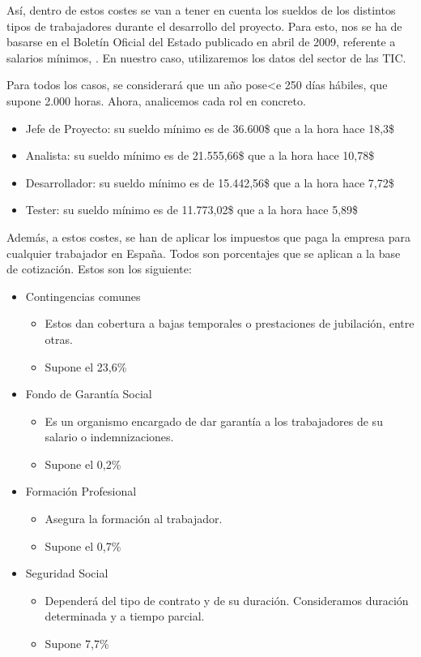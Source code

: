 Así, dentro de estos costes se van a tener en cuenta los sueldos de los distintos tipos de trabajadores durante el desarrollo del proyecto. Para esto, nos se ha de basarse en el Boletín Oficial del Estado publicado en abril de 2009, referente a salarios mínimos, \cite{boe_salarios}. En nuestro caso, utilizaremos los datos del sector de las TIC.

Para todos los casos, se considerará que un año pose<e 250 días hábiles, que supone 2.000 horas. Ahora, analicemos cada rol en concreto.

\begin{itemize}
    \item Jefe de Proyecto: su sueldo mínimo es de 36.600\$ que a la hora hace 18,3\$
    \item Analista: su sueldo mínimo es de 21.555,66\$ que a la hora hace 10,78\$
    \item Desarrollador: su sueldo mínimo es de 15.442,56\$ que a la hora hace 7,72\$
    \item Tester: su sueldo mínimo es de 11.773,02\$ que a la hora hace 5,89\$
\end{itemize}

Además, a estos costes, se han de aplicar los impuestos que paga la empresa para cualquier trabajador en España. Todos son porcentajes que se aplican a la base de cotización. Estos son los siguiente:
\begin{itemize}
    \item Contingencias comunes
    \begin{itemize}
        \item Estos dan cobertura a bajas temporales o prestaciones de jubilación, entre otras.
        \item Supone el 23,6\%
    \end{itemize}
    \item Fondo de Garantía Social
    \begin{itemize}
        \item Es un organismo encargado de dar garantía a los trabajadores de su salario o indemnizaciones.
        \item Supone el 0,2\%
    \end{itemize}
    \item Formación Profesional
    \begin{itemize}
        \item Asegura la formación al trabajador.
        \item Supone el 0,7\%
    \end{itemize}
    \item Seguridad Social
    \begin{itemize}
        \item Dependerá del tipo de contrato y de su duración. Consideramos duración determinada y a tiempo parcial.
        \item Supone 7,7\%
    \end{itemize}
\end{itemize}

